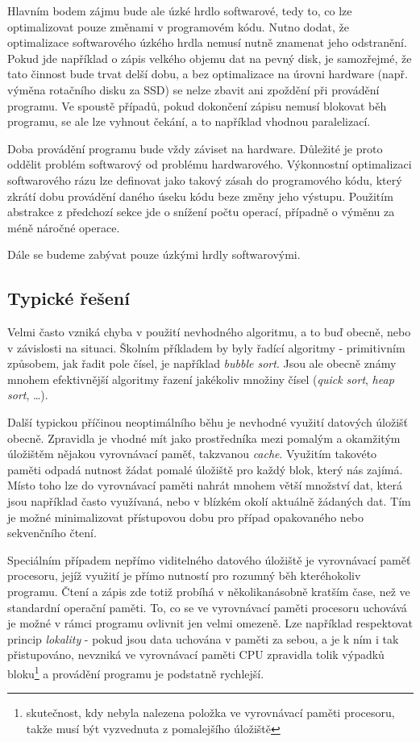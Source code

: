 \documentclass[czech,BP]{thesiskiv}
\begin{document}
Hlavním bodem zájmu bude ale úzké hrdlo softwarové, tedy to, co lze optimalizovat pouze změnami v programovém kódu. Nutno dodat, že optimalizace softwarového úzkého hrdla nemusí nutně znamenat jeho odstranění. Pokud jde například o zápis velkého objemu dat na pevný disk, je samozřejmé, že tato činnost bude trvat delší dobu, a bez optimalizace na úrovni hardware (např. výměna rotačního disku za SSD) se nelze zbavit ani zpoždění při provádění programu. Ve spoustě případů, pokud dokončení zápisu nemusí blokovat běh programu, se ale lze vyhnout čekání, a to například vhodnou paralelizací.

Doba provádění programu bude vždy záviset na hardware. Důležité je proto oddělit problém softwarový od problému hardwarového. Výkonnostní optimalizaci softwarového rázu lze definovat jako takový zásah do programového kódu, který zkrátí dobu provádění daného úseku kódu beze změny jeho výstupu. Použitím abstrakce z předchozí sekce jde o snížení počtu operací, případně o výměnu za méně náročné operace.

Dále se budeme zabývat pouze úzkými hrdly softwarovými.

\subsection{Typické řešení}

Velmi často vzniká chyba v použití nevhodného algoritmu, a to buď obecně, nebo v závislosti na situaci. Školním příkladem by byly řadící algoritmy - primitivním způsobem, jak řadit pole čísel, je například \emph{bubble sort}. Jsou ale obecně známy mnohem efektivnější algoritmy řazení jakékoliv množiny čísel (\emph{quick sort}, \emph{heap sort}, \dots). 

Další typickou příčinou neoptimálního běhu je nevhodné využití datových úložišť obecně. Zpravidla je vhodné mít jako prostředníka mezi pomalým a okamžitým úložištěm nějakou vyrovnávací paměť, takzvanou \emph{cache}. Využitím takovéto paměti odpadá nutnost žádat pomalé úložiště pro každý blok, který nás zajímá. Místo toho lze do vyrovnávací paměti nahrát mnohem větší množství dat, která jsou například často využívaná, nebo v blízkém okolí aktuálně žádaných dat. Tím je možné minimalizovat přístupovou dobu pro případ opakovaného nebo sekvenčního čtení.

Speciálním případem nepřímo viditelného datového úložiště je vyrovnávací paměť procesoru, jejíž využití je přímo nutností pro rozumný běh kteréhokoliv programu. Čtení a zápis zde totiž probíhá v několikanásobně kratším čase, než ve standardní operační paměti. To, co se ve vyrovnávací paměti procesoru uchovává je možné v rámci programu ovlivnit jen velmi omezeně. Lze například respektovat princip \emph{lokality} - pokud jsou data uchována v paměti za sebou, a je k ním i tak přistupováno, nevzniká ve vyrovnávací paměti CPU zpravidla tolik výpadků bloku\footnote{skutečnost, kdy nebyla nalezena položka ve vyrovnávací paměti procesoru, takže musí být vyzvednuta z pomalejšího úložiště} a provádění programu je podstatně rychlejší.
\end{document}
